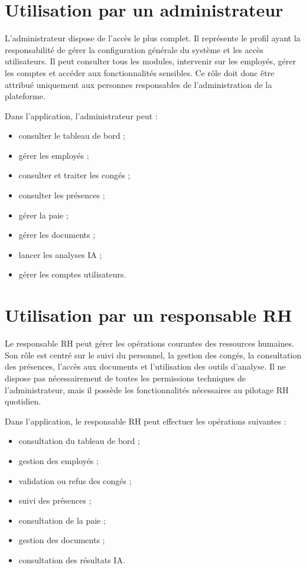 \documentclass[12pt,a4paper]{report}
\begin{document}
\section{Utilisation par un administrateur}

L'administrateur dispose de l'accès le plus complet. Il représente le profil ayant la responsabilité de gérer la configuration générale du système et les accès utilisateurs. Il peut consulter tous les modules, intervenir sur les employés, gérer les comptes et accéder aux fonctionnalités sensibles. Ce rôle doit donc être attribué uniquement aux personnes responsables de l'administration de la plateforme.

Dans l'application, l'administrateur peut :

\begin{itemize}
    \item consulter le tableau de bord ;
    \item gérer les employés ;
    \item consulter et traiter les congés ;
    \item consulter les présences ;
    \item gérer la paie ;
    \item gérer les documents ;
    \item lancer les analyses IA ;
    \item gérer les comptes utilisateurs.
\end{itemize}

\section{Utilisation par un responsable RH}

Le responsable RH peut gérer les opérations courantes des ressources humaines. Son rôle est centré sur le suivi du personnel, la gestion des congés, la consultation des présences, l'accès aux documents et l'utilisation des outils d'analyse. Il ne dispose pas nécessairement de toutes les permissions techniques de l'administrateur, mais il possède les fonctionnalités nécessaires au pilotage RH quotidien.

Dans l'application, le responsable RH peut effectuer les opérations suivantes :

\begin{itemize}
    \item consultation du tableau de bord ;
    \item gestion des employés ;
    \item validation ou refus des congés ;
    \item suivi des présences ;
    \item consultation de la paie ;
    \item gestion des documents ;
    \item consultation des résultats IA.
\end{itemize}
\end{document}
